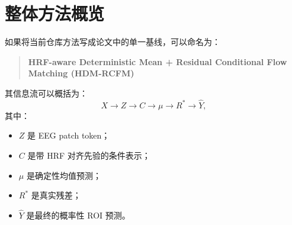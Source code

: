 \documentclass[11pt,a4paper]{ctexart}
\begin{document}
\section{整体方法概览}

如果将当前仓库方法写成论文中的单一基线，可以命名为：
\begin{quote}
\textbf{HRF-aware Deterministic Mean + Residual Conditional Flow Matching (HDM-RCFM)}
\end{quote}

其信息流可以概括为：
\begin{equation}
X \rightarrow Z \rightarrow C \rightarrow \mu \rightarrow R^{*} \rightarrow \hat{Y},
\end{equation}
其中：
\begin{itemize}
  \item $Z$ 是 EEG patch token；
  \item $C$ 是带 HRF 对齐先验的条件表示；
  \item $\mu$ 是确定性均值预测；
  \item $R^{*}$ 是真实残差；
  \item $\hat{Y}$ 是最终的概率性 ROI 预测。
\end{itemize}
\end{document}
